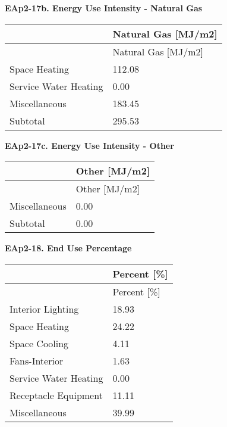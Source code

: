 \textbf{EAp2-17b. Energy Use Intensity - Natural Gas}

\begin{longtable}[c]{@{}ll@{}}
\toprule 
 & Natural Gas [MJ/m2] \tabularnewline
\midrule
\endfirsthead

\toprule 
 & Natural Gas [MJ/m2] \tabularnewline
\midrule
\endhead

Space Heating & 112.08 \tabularnewline
Service Water Heating & 0.00 \tabularnewline
Miscellaneous & 183.45 \tabularnewline
Subtotal & 295.53 \tabularnewline
\bottomrule
\end{longtable}

\textbf{EAp2-17c. Energy Use Intensity - Other}

\begin{longtable}[c]{@{}ll@{}}
\toprule 
 & Other [MJ/m2] \tabularnewline
\midrule
\endfirsthead

\toprule 
 & Other [MJ/m2] \tabularnewline
\midrule
\endhead

Miscellaneous & 0.00 \tabularnewline
Subtotal & 0.00 \tabularnewline
\bottomrule
\end{longtable}

\textbf{EAp2-18. End Use Percentage}

\begin{longtable}[c]{@{}ll@{}}
\toprule 
 & Percent [\%] \tabularnewline
\midrule
\endfirsthead

\toprule 
 & Percent [\%] \tabularnewline
\midrule
\endhead

Interior Lighting & 18.93 \tabularnewline
Space Heating & 24.22 \tabularnewline
Space Cooling & 4.11 \tabularnewline
Fans-Interior & 1.63 \tabularnewline
Service Water Heating & 0.00 \tabularnewline
Receptacle Equipment & 11.11 \tabularnewline
Miscellaneous & 39.99 \tabularnewline
\bottomrule
\end{longtable}

